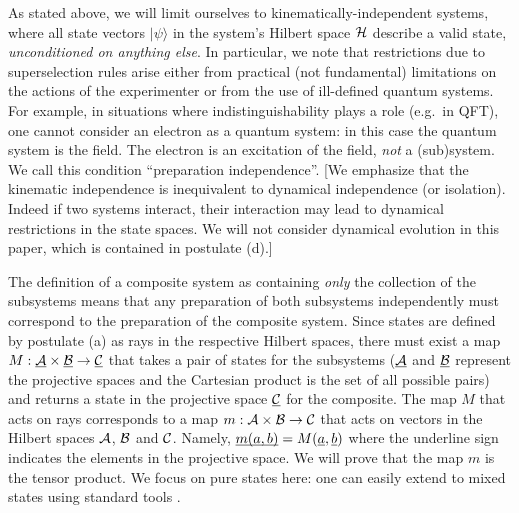 \documentclass[aps,prl,amsmath,amssymb,twocolumn,nofootinbib]{revtex4}
\theoremstyle{plain}
\theoremstyle{definition}
\theoremstyle{remark}
\newcommand{\pj}[1] {\underbar{$#1$}}
\def\>{\rangle}
\def\commentg#1{ [{\bf Comment Gabriele:} {\sf #1}]}
\def\togli#1{}
\begin{document}
\togli{This axiomatization implicitly contains a definition of
  ``quantum system'' which is crucial for what follows, so we need to
  clarify the assumptions that it contains. We will use the following
  definition for a quantum system\togli{$\stackon[1pt]={\mbox{\tiny
        def}}$}$\stackrel{\mbox{\tiny def}}=${\em ``a quantum degree
    of freedom with $d$ (possibly discrete, or continuous, infinite)
    mutually exclusive (commuting) values for each of its properties.
    Its mathematical description is through a Hilbert space of
    dimension $d$ which contains all the states that describe the
    values of its possible properties. In accordance with the
    postulate (a), these values correspond to a basis of the space,
    given by the eigenvectors of the observable corresponding to that
    property''}. \commentg{We may have to revise to be more clear.
    Where is this used?} } As stated above, we will limit ourselves to
kinematically-independent systems, where all state vectors $|\psi\>$
in the system's Hilbert space $\cal H$ describe a valid state, {\em
  unconditioned on anything else}. In particular, we note that
restrictions due to superselection rules arise either from practical
(not fundamental) limitations on the actions of the experimenter
\cite{susskind,zanardi,zanardilloyd} or from the use of ill-defined
quantum systems. For example, in situations where indistinguishability
plays a role (e.g.~in QFT), one cannot consider an electron as a
quantum system: in this case the quantum system is the field. The
electron is an excitation of the field, {\em not} a (sub)system. We
call this condition ``preparation independence''.  [We emphasize that
the kinematic independence is inequivalent to dynamical independence
(or isolation).  Indeed if two systems interact, their interaction may
lead to dynamical restrictions in the state spaces. We will not
consider dynamical evolution in this paper, which is contained in
postulate (d).]

The definition of a composite system as containing {\em only} the
collection of the subsystems means that any preparation of both
subsystems independently must correspond to the preparation of the
composite system. Since states are defined by postulate (a) as rays in
the respective Hilbert spaces, there must exist a map $M : \pj{\cal A}
\times \pj{\cal B } \to \pj{\cal C}$ that takes a pair of states for
the subsystems ($\pj{\cal A}$ and $\pj{\cal B }$ represent the
projective spaces and the Cartesian product is the set of all possible
pairs) and returns a state in the projective space $\pj{\cal C}$ for
the composite. The map $M$ that acts on rays corresponds to a map
$m:{\cal A}\times{\cal B}\to{\cal C}$ that acts on vectors in the
Hilbert spaces $\cal A$, $\cal B$ and $\cal C$.  Namely,
$\pj{m(a,b)}=M(\pj{a},\pj{b})$ where the underline sign indicates the
elements in the projective space. We will prove that the map $m$ is
the tensor product. We focus on pure states here: one can easily
extend to mixed states using standard tools \cite{nielsenchuang}.
\end{document}
